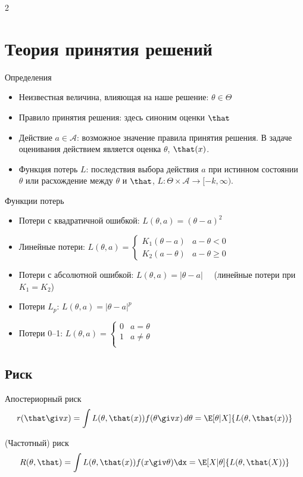 \documentclass[landscape]{article}
\begin{document}
\begin{multicols*}{2}
\section{Теория принятия решений}

Определения
\begin{itemize}
  \item Неизвестная величина, влияющая на наше решение: $\theta \in \Theta$
  \item Правило принятия решения: здесь синоним оценки $\that$
  \item Действие $a \in \mathcal{A}$: возможное значение правила принятия решения.
    В задаче оценивания действием является оценка $\theta$, $\that(x)$.
  \item Функция потерь $L$: последствия выбора действия $a$ при истинном состоянии
    $\theta$ или расхождение между $\theta$ и $\that$,
    $L: \Theta \times \mathcal{A} \to [-k,\infty).$
\end{itemize}

Функции потерь
\begin{itemize}
  \item Потери с квадратичной ошибкой: $L(\theta,a) = (\theta-a)^2$
  \item Линейные потери: $L(\theta,a) = \begin{cases}
      K_1(\theta-a) & a-\theta < 0 \\
      K_2(a-\theta) & a-\theta \ge 0
    \end{cases}$
  \item Потери с абсолютной ошибкой: $L(\theta,a) = |\theta-a| \quad$
    (линейные потери при $K_1=K_2$)
  \item Потери $L_p$: $L(\theta,a) = |\theta-a|^p$
  \item Потери 0–1: $L(\theta,a) = \begin{cases}
      0 & a=\theta \\
      1 & a\neq\theta \\
    \end{cases}$
\end{itemize}

\subsection{Риск}

Апостериорный риск
\[r(\that \giv x)
= \int L(\theta,\that(x))f(\theta\giv x)\,d\theta
= \E[\theta|X]{L(\theta,\that(x))}\]

(Частотный) риск
\[R(\theta,\that)
= \int L(\theta,\that(x)) f(x\giv\theta) \dx
= \E[X|\theta]{L(\theta,\that(X))}\]


\end{multicols*}
\end{document}
